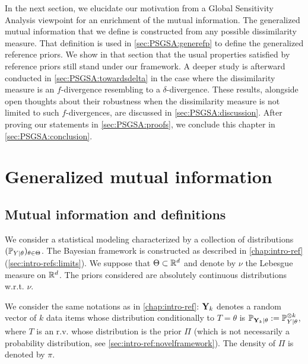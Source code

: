 In the next section, %
we elucidate our motivation 
from a Global Sensitivity Analysis viewpoint for an enrichment of the mutual information. 
The generalized mutual information that we define is constructed from any possible dissimilarity measure.
That definition is used in \cref{sec:PSGSA:generefp} to define the generalized reference priors. We show in that section that the usual properties satisfied by reference priors still stand under our framework.
A deeper study is afterward conducted in \cref{sec:PSGSA:towardsdelta} in the case where the dissimilarity measure is an $f$-divergence resembling to a $\delta$-divergence. 
These results, alongside open thoughts about their robustness when the dissimilarity measure is not limited to such $f$-divergences, are discussed in \cref{sec:PSGSA:discussion}.
After proving our statements in \cref{sec:PSGSA:proofs}, we conclude this chapter in \cref{sec:PSGSA:conclusion}.







\section{Generalized mutual information}\label{sec:PSGSA:genMI}

\subsection{Mutual information and definitions}


We consider a statistical modeling characterized by a collection of distributions $(\mathbb{P}_{Y|\theta})_{\theta\in\Theta}$. 
The Bayesian framework is constructed as described in \cref{chap:intro-ref} (\cref{sec:intro-refs:limits}). We suppose that $\Theta\subset\mathbb{R}^d$ and denote by $\nu$ the Lebesgue measure on $\mathbb{R}^d$. 
The priors considered are absolutely continuous distributions w.r.t. $\nu$.

We consider the same notations as in \cref{chap:intro-ref}: $\mathbf{Y}_k$ denotes a random vector of $k$ data items whose distribution conditionally to $T=\theta$ is $\mathbb{P}_{\mathbf{Y}_k|\theta}:=\mathbb{P}_{Y|\theta}^{\otimes k}$, where $T$ is an r.v. whose distribution is the prior $\varPi$ (which is not necessarily a probability distribution, see \cref{sec:intro-ref:novelframework}). The density of $\varPi$ is denoted by $\pi$.

